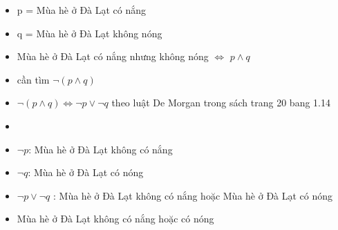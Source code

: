 \documentclass{article}
\begin{document}
\begin{enumerate}
\begin{itemize}
        \item p = Mùa hè ở Đà Lạt có nắng
        \item q = Mùa hè ở Đà Lạt không nóng
        \item Mùa hè ở Đà Lạt có nắng nhưng không nóng $\Longleftrightarrow$ $p \wedge q$
        \item cần tìm $\neg(p \wedge q)$
        \item $\neg(p \wedge q) \Longleftrightarrow \neg p \vee \neg q$ theo luật De Morgan trong sách trang 20 bang 1.14
        \item \item $\neg p$: Mùa hè ở Đà Lạt không có nắng
        \item $\neg q$: Mùa hè ở Đà Lạt có nóng
        \item $\neg p \vee \neg q$ : Mùa hè ở Đà Lạt không có nắng hoặc Mùa hè ở Đà Lạt có nóng
        \item  Mùa hè ở Đà Lạt không có nắng hoặc có nóng
    \end{itemize}
\end{enumerate}
\end{document}
